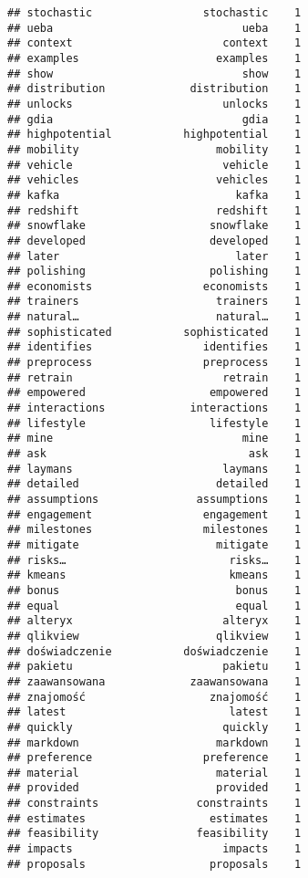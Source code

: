 \documentclass[]{article}
\begin{document}
\begin{verbatim}
## stochastic                 stochastic    1
## ueba                             ueba    1
## context                       context    1
## examples                     examples    1
## show                             show    1
## distribution             distribution    1
## unlocks                       unlocks    1
## gdia                             gdia    1
## highpotential           highpotential    1
## mobility                     mobility    1
## vehicle                       vehicle    1
## vehicles                     vehicles    1
## kafka                           kafka    1
## redshift                     redshift    1
## snowflake                   snowflake    1
## developed                   developed    1
## later                           later    1
## polishing                   polishing    1
## economists                 economists    1
## trainers                     trainers    1
## natural…                     natural…    1
## sophisticated           sophisticated    1
## identifies                 identifies    1
## preprocess                 preprocess    1
## retrain                       retrain    1
## empowered                   empowered    1
## interactions             interactions    1
## lifestyle                   lifestyle    1
## mine                             mine    1
## ask                               ask    1
## laymans                       laymans    1
## detailed                     detailed    1
## assumptions               assumptions    1
## engagement                 engagement    1
## milestones                 milestones    1
## mitigate                     mitigate    1
## risks…                         risks…    1
## kmeans                         kmeans    1
## bonus                           bonus    1
## equal                           equal    1
## alteryx                       alteryx    1
## qlikview                     qlikview    1
## doświadczenie           doświadczenie    1
## pakietu                       pakietu    1
## zaawansowana             zaawansowana    1
## znajomość                   znajomość    1
## latest                         latest    1
## quickly                       quickly    1
## markdown                     markdown    1
## preference                 preference    1
## material                     material    1
## provided                     provided    1
## constraints               constraints    1
## estimates                   estimates    1
## feasibility               feasibility    1
## impacts                       impacts    1
## proposals                   proposals    1

\end{verbatim}
\end{document}
